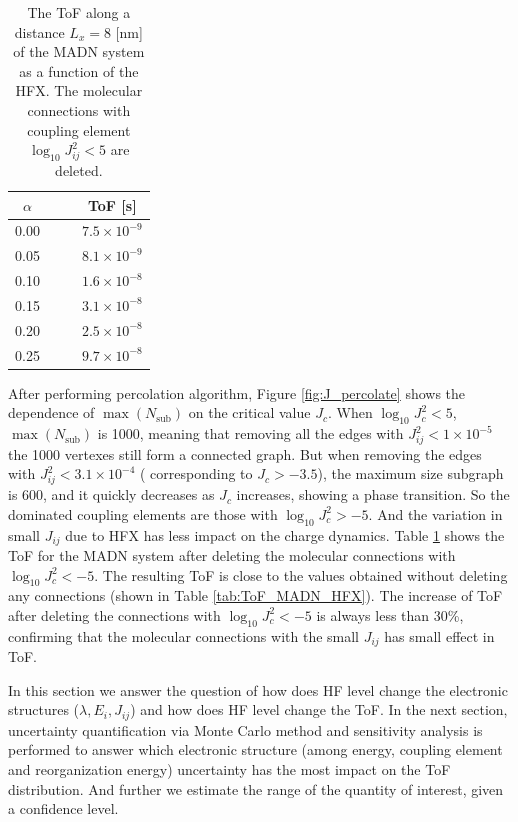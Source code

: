 \documentclass[%
 reprint,
 amsmath,amssymb,
 aps,
]{revtex4-2}
\begin{document}
\begin{table}[H]
  \caption{\label{tab:ToF_J} The ToF along a distance $L_x = 8$ [nm] of the MADN system as a function of the HFX. The molecular connections with coupling element $\log_{10} J^2_{ij} < 5$ are deleted.}
  \centering
  \begin{tabular}{c c c c }
  \hline
  \hline
      $\alpha$ & & & ToF [s]  \\
  \hline
      0.00 & & &  $7.5 \times 10^{-9}$ \\
      0.05 & & & $ 8.1 \times 10^{-9}$ \\
      0.10 & & & $ 1.6 \times 10^{-8}$ \\
      0.15 & & & $ 3.1 \times 10^{-8}$ \\
      0.20 & & & $ 2.5 \times 10^{-8}$ \\
      0.25 & & & $ 9.7 \times 10^{-8}$ \\
  \hline
  \hline
  \end{tabular}
\end{table}

After performing percolation algorithm, Figure \ref{fig:J_percolate} shows the dependence of $\max({N_\text{sub}})$ on the critical value $J_c$. When $\log_{10} J_c^2 < 5$, $\max({N_\text{sub}})$ is 1000, meaning that removing all the edges with $J_{ij}^2 < 1 \times 10^{-5}$ the 1000 vertexes still form a connected graph. 
But when removing the edges with $J_{ij}^2 < 3.1 \times 10^{-4}$ ( corresponding to $J_c > -3.5$), the maximum size subgraph is 600, and it quickly decreases as $J_c$ increases, showing a phase transition. 
So the dominated coupling elements are those with $\log_{10} J_c^2 > -5$. 
And the variation in small $J_{ij}$ due to HFX has less impact on the charge dynamics. Table \ref{tab:ToF_J} shows the ToF for the MADN system after deleting the molecular connections with  $\log_{10} J_c^2 < -5$. The resulting ToF is close to the values obtained without deleting any connections (shown in Table \ref{tab:ToF_MADN_HFX}).
The increase of ToF after deleting the connections with  $\log_{10} J_c^2 < -5$ is always less than 30\%, confirming that the molecular connections with the small $J_{ij}$ has small effect in ToF. 

In this section we answer the question of how does HF level change the electronic structures ($\lambda, E_i, J_{ij}$) and 
how does HF level change the ToF. 
In the next section, uncertainty quantification via Monte Carlo method and sensitivity analysis is performed to answer which electronic structure (among energy, coupling element and reorganization energy) uncertainty has the most impact on the ToF distribution. 
And further we estimate the range of the quantity of interest, given a confidence level.
\end{document}
